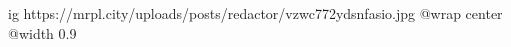  
 
 
 
 

\ifcmt
  ig https://mrpl.city/uploads/posts/redactor/vzwc772ydsnfasio.jpg
  @wrap center
  @width 0.9
\fi
